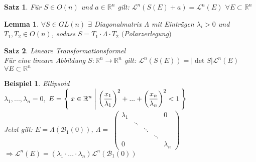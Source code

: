 \documentclass[11pt]{memoir}
\theoremstyle{changebreak}
\newtheorem{Beispiel}{Beispiel}[chapter]
\newtheorem{Lemma}{Lemma}[chapter]
\newtheorem{Satz}{Satz}[chapter]
\begin{document}
\begin{Satz}
Für $S \in O(n)$ und $a \in \mathbb R^n$ gilt:
$\mathscr L^n (S(E) +a) = \mathscr L^n(E)$ $\forall E \subset \mathbb R^n$
\end{Satz}


\begin{Lemma}
$\forall S \in GL(n)$ $\exists$ Diagonalmatrix $\Lambda$ mit Einträgen $\lambda_i > 0$ und $T_1, T_2 \in O(n)$, sodass $S = T_1\cdotp\Lambda\cdotp T_2$ $($Polarzerlegung$)$
\end{Lemma}


\begin{Satz}
\emph{Lineare Transformationsformel} \\
Für eine lineare Abbildung $S: \mathbb R^n \rightarrow \mathbb R^n$ gilt: $\mathscr L^n(S(E)) = |\det S| \mathscr L^n(E)$ $\forall E \subset \mathbb R^n$
\end{Satz}


\begin{Beispiel}
\emph{Ellipsoid} \\
$\lambda_1, ..., \lambda_n = 0$, $E = \Set{ x \in \mathbb R^n | \left( \dfrac{x_1}{\lambda_1} \right)^2 + ... + \left (\dfrac{x_n}{\lambda_n}\right)^2 < 1 }$ \\
Jetzt gilt: $E = \Lambda(\mathscr B_1(0))$, $\Lambda =$
$\begin{pmatrix}
      \lambda_1 & 	 &	&	& 0 \\
      		 &  	\ddots \\
		 &	& \ddots \\
		 &	&	& \ddots \\
		 0 &	&	&	&	\lambda_n
\end{pmatrix}$
$\Rightarrow \mathscr L^n(E) = (\lambda_1 \cdotp ... \cdotp \lambda_n)\mathscr L^n(\mathscr B_1(0))$
\end{Beispiel}
\end{document}
